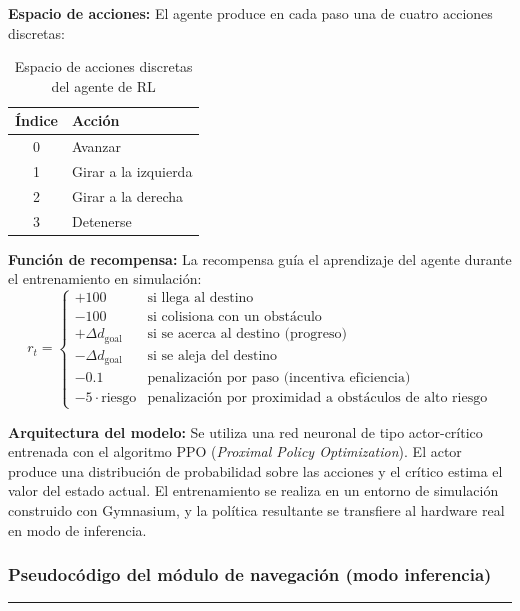 \textbf{Espacio de acciones:}
El agente produce en cada paso una de cuatro acciones discretas:

\begin{table}[H]
\centering
\begin{tabular}{cl}
\hline
\textbf{Índice} & \textbf{Acción} \\
\hline
0 & Avanzar \\
1 & Girar a la izquierda \\
2 & Girar a la derecha \\
3 & Detenerse \\
\hline
\end{tabular}
\caption{Espacio de acciones discretas del agente de RL}
\end{table}

\textbf{Función de recompensa:}
La recompensa guía el aprendizaje del agente durante el entrenamiento en simulación:
\[
r_t =
\begin{cases}
+100 & \text{si llega al destino} \\
-100 & \text{si colisiona con un obstáculo} \\
+\Delta d_{\text{goal}} & \text{si se acerca al destino (progreso)} \\
-\Delta d_{\text{goal}} & \text{si se aleja del destino} \\
-0.1 & \text{penalización por paso (incentiva eficiencia)} \\
-5 \cdot \text{riesgo} & \text{penalización por proximidad a obstáculos de alto riesgo}
\end{cases}
\]

\textbf{Arquitectura del modelo:}
Se utiliza una red neuronal de tipo actor-crítico entrenada con el algoritmo PPO
(\textit{Proximal Policy Optimization}). El actor produce una distribución de
probabilidad sobre las acciones y el crítico estima el valor del estado actual.
El entrenamiento se realiza en un entorno de simulación construido con Gymnasium,
y la política resultante se transfiere al hardware real en modo de inferencia.

\subsubsection{Pseudocódigo del módulo de navegación (modo inferencia)}

\begin{center}
\label{alg:nav}
\end{center}
\vspace{-1.8cm}
\rule{\textwidth}{0.4pt}
\vspace{-0.9cm}

